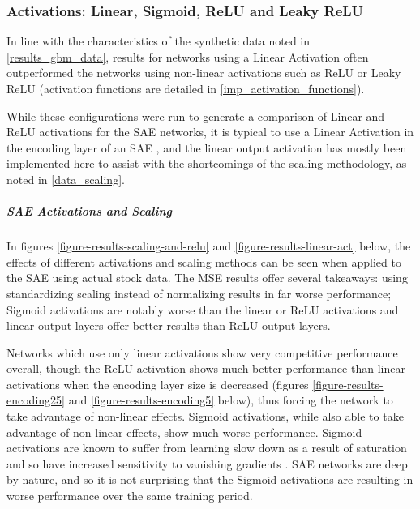 \documentclass[a4paper,11pt,oneside]{article}
\theoremstyle{plain}
\theoremstyle{definition}
\begin{document}
\subsubsection{Activations: Linear, Sigmoid, ReLU and Leaky ReLU}

In line with the characteristics of the synthetic data noted in \ref{results_gbm_data}, results for networks using a Linear Activation often outperformed the networks using non-linear activations such as ReLU or Leaky ReLU (activation functions are detailed in \ref{imp_activation_functions}). \newline

While these configurations were run to generate a comparison of Linear and ReLU activations for the SAE networks, it is typical to use a Linear Activation in the encoding layer of an SAE \cite{Hinton2}, and the linear output activation has mostly been implemented here to assist with the shortcomings of the scaling methodology, as noted in \ref{data_scaling}.\newline

\subparagraph{SAE Activations and Scaling}\label{results_sae_activations_scaling}

In figures \ref{figure-results-scaling-and-relu} and \ref{figure-results-linear-act} below, the effects of different activations and scaling methods can be seen when applied to the SAE using actual stock data. The MSE results offer several takeaways: using standardizing scaling instead of normalizing results in far worse performance; Sigmoid activations are notably worse than the linear or ReLU activations and linear output layers offer better results than ReLU output layers. \newline

 Networks which use only linear activations show very competitive performance overall, though the ReLU activation shows much better performance than linear activations when the encoding layer size is decreased (figures \ref{figure-results-encoding25} and \ref{figure-results-encoding5} below), thus forcing the network to take advantage of non-linear effects. Sigmoid activations, while also able to take advantage of non-linear effects, show much worse performance. Sigmoid activations are known to suffer from learning slow down as a result of saturation and so have increased sensitivity to vanishing gradients \cite{Glorot2}. SAE networks are deep by nature, and so it is not surprising that the Sigmoid activations are resulting in worse performance over the same training period. \newline
\end{document}
